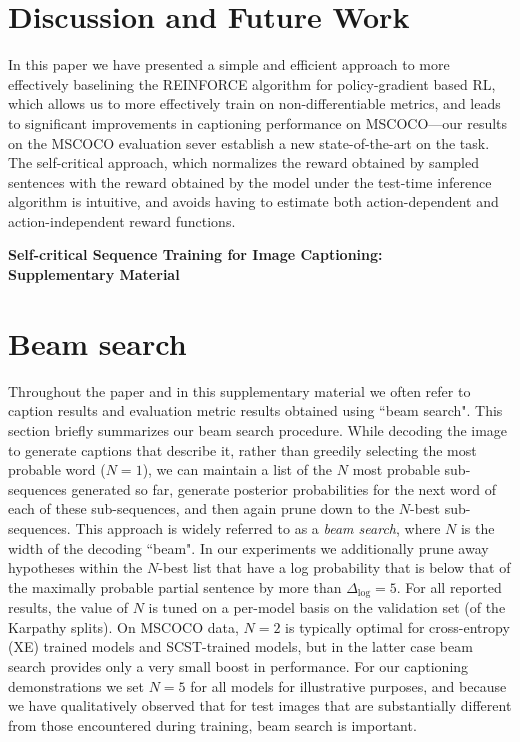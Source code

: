 \documentclass[10pt,twocolumn,letterpaper]{article}
\begin{document}
\section{Discussion and Future Work}

In this paper we have presented a simple and efficient approach to more effectively baselining the REINFORCE algorithm for policy-gradient based RL, which allows us to more effectively train on non-differentiable metrics, and leads to significant improvements in captioning performance on MSCOCO---our results on the MSCOCO evaluation sever establish a new state-of-the-art on the task. The self-critical approach, which normalizes the reward obtained by sampled sentences with the reward obtained by the model under the test-time inference algorithm is intuitive, and avoids having to estimate both action-dependent and action-independent reward functions. 


{\small


}




\onecolumn 
\appendix
\begin{center}
\bf \Large Self-critical Sequence Training for Image Captioning:\\
 Supplementary Material
\end{center}
\section{Beam search}
Throughout the paper and in this supplementary material we often refer to caption results and evaluation metric results obtained using ``beam search". This section briefly summarizes our beam search procedure. While decoding the image to generate captions that describe it, rather than greedily selecting the most probable word ($N=1$), we can maintain a list of the $N$ most probable sub-sequences generated so far, generate posterior probabilities for the next word of each of these sub-sequences, and then again prune down to the $N$-best sub-sequences. This approach is widely referred to as a \emph{beam search}, where $N$ is the width of the decoding ``beam". In our experiments we additionally prune away hypotheses within the $N$-best list that have a log probability that is below that of the maximally probable partial sentence by more than $\Delta_{\log} = 5$. For all reported results, the value of $N$ is tuned on a per-model basis on the validation set (of the Karpathy splits). On MSCOCO data, $N=2$ is typically optimal for cross-entropy (XE) trained models and SCST-trained models, but in the latter case beam search provides only a very small boost in performance. For our captioning demonstrations we set $N=5$ for all models for illustrative purposes, and because we have qualitatively observed that for test images that are substantially different from those encountered during training, beam search is important. 
\end{document}
